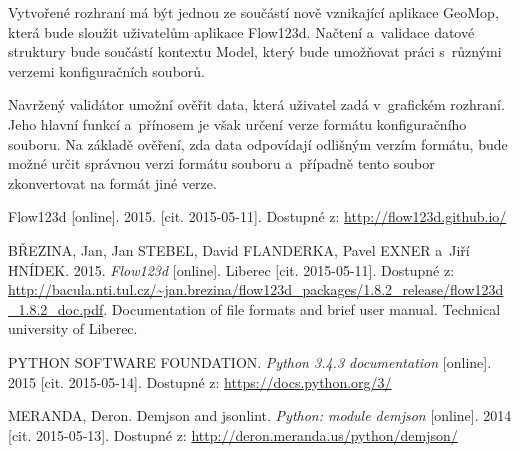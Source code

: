 \documentclass[FM,MP]{tulthesis}
\begin{document}
	Vytvořené rozhraní má být jednou ze součástí nově vznikající aplikace GeoMop, která bude sloužit uživatelům aplikace Flow123d. Načtení a~validace datové struktury bude součástí kontextu Model, který bude umožňovat práci s~různými verzemi konfiguračních souborů.

	Navržený validátor umožní ověřit data, která uživatel zadá v~grafickém rozhraní. Jeho hlavní funkcí a~přínosem je však určení verze formátu konfiguračního souboru. Na základě ověření, zda data odpovídají odlišným verzím formátu, bude možné určit správnou verzi formátu souboru a~případně tento soubor zkonvertovat na formát jiné verze.

\begin{thebibliography}{9}
	
		Flow123d [online]. 2015. [cit. 2015-05-11]. Dostupné z: \url{http://flow123d.github.io/}
		
		BŘEZINA, Jan, Jan STEBEL, David FLANDERKA, Pavel EXNER a~Jiří HNÍDEK. 2015. \textit{Flow123d} [online]. Liberec [cit. 2015-05-11]. Dostup\-né z: \url{http://bacula.nti.tul.cz/~jan.brezina/flow123d_packages/1.8.2_release/flow123d_1.8.2_doc.pdf}. Documentation of file formats and brief user manual. Technical university of Liberec.

		PYTHON SOFTWARE FOUNDATION. \textit{Python 3.4.3 documentation} [online]. 2015 [cit. 2015-05-14]. Dostupné z: \url{https://docs.python.org/3/}
		
		MERANDA, Deron. Demjson and jsonlint. \textit{Python: module demjson} [online]. 2014 [cit. 2015-05-13]. Dostupné z: \url{http://deron.meranda.us/python/demjson/}
	
\end{thebibliography}
\end{document}
